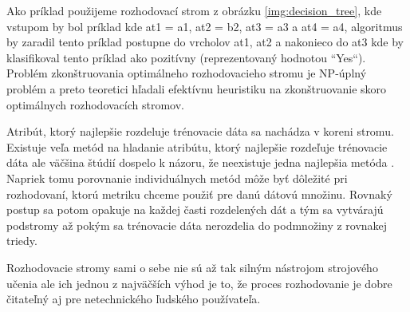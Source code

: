 Ako príklad použijeme rozhodovací strom z obrázku \ref{img:decision_tree}, kde vstupom by bol príklad kde at1 = a1, at2 = b2, at3 = a3 a at4 = a4, algoritmus by zaradil tento príklad postupne do vrcholov at1, at2 a nakonieco do at3 kde by klasifikoval tento príklad ako pozitívny (reprezentovaný hodnotou ``Yes``). Problém zkonštruovania optimálneho rozhodovacieho stromu je NP-úplný problém a preto teoretici hľadali efektívnu heuristiku na zkonštruovanie skoro optimálnych rozhodovacích stromov.\par
Atribút, ktorý najlepšie rozdeluje trénovacie dáta sa nachádza v koreni stromu. Existuje veľa metód na hladanie atribútu, ktorý najlepšie rozdeľuje trénovacie dáta ale väčšina štúdií dospelo k názoru, že neexistuje jedna najlepšia metóda \cite{decision_trees}. Napriek tomu porovnanie individuálnych metód môže byť dôležité pri rozhodovaní, ktorú metriku chceme použiť pre danú dátovú množinu. Rovnaký postup sa potom opakuje na každej časti rozdelených dát a tým sa vytvárajú podstromy až pokým sa trénovacie dáta nerozdelia do podmnožiny z rovnakej triedy.\par
Rozhodovacie stromy sami o sebe nie sú až tak silným nástrojom strojového učenia ale ich jednou z najväčších výhod je to, že proces rozhodovanie je dobre čitateľný aj pre netechnického ľudského používateľa.
